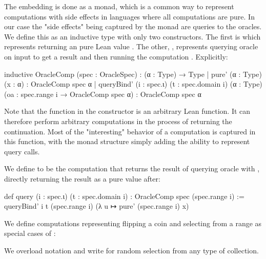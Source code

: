 The embedding is done as a monad, which is a common way to represent computations with side effects in languages where all computations are pure.
In our case the "side effects" being captured by the monad are queries to the oracles.  We define this as an inductive type with only two constructors.
The first is  which represents returning an pure Lean value .
The other, , represents querying oracle  on input  to get a result  and then running the computation .  Explicitly:
\begin{leancode}
  inductive OracleComp (spec : OracleSpec) : (α : Type) → Type
    | pure' (α : Type) (x : α) : OracleComp spec α
    | queryBind' (i : spec.ι) (t : spec.domain i)
        (α : Type) (oa : spec.range i → OracleComp spec α) :
        OracleComp spec α
\end{leancode}
Note that the function  in the  constructor is an arbitrary Lean function.
It can therefore perform arbitrary computations in the process of returning the continuation.
Most of the "interesting" behavior of a computation is captured in this function, with the monad structure simply adding the ability to represent query calls.

We define  to be the computation that returns the result of querying oracle  with , directly returning the result as a pure value after:
\begin{leancode}
  def query (i : spec.ι) (t : spec.domain i) : 
    OracleComp spec (spec.range i) :=
    queryBind' i t (spec.range i) (λ u ↦ pure' (spec.range i) x)
\end{leancode}
We define computations representing flipping a coin and selecting from a range as special cases of :
We overload notation and write  for random selection from any type of collection.

